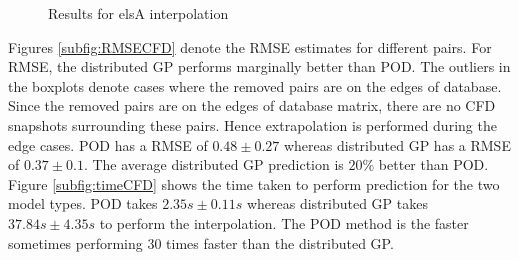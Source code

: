 \begin{figure}[!ht]
  \centering
  \quad
  \caption{Results for elsA interpolation}
\end{figure}

Figures \ref{subfig:RMSECFD} denote the RMSE estimates for different pairs. For RMSE, the distributed GP performs marginally better than POD. The outliers in the boxplots denote cases where the removed pairs are on the edges of database. Since the removed pairs are on the edges of database matrix, there are no CFD snapshots surrounding these pairs. Hence extrapolation is performed during the edge cases. POD has a RMSE of $0.48\pm0.27$ whereas distributed GP has a RMSE of $0.37\pm0.1$. The average distributed GP prediction is $20\%$ better than POD. Figure \ref{subfig:timeCFD} shows the time taken to perform prediction for the two model types. POD takes $2.35s\pm0.11s$ whereas distributed GP takes $37.84s\pm4.35s$ to perform the interpolation. The POD method is the faster sometimes performing 30 times faster than the distributed GP. 

